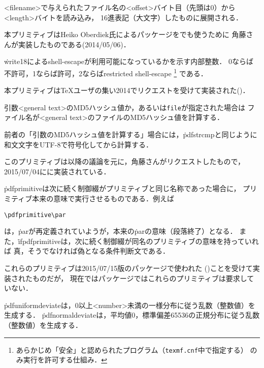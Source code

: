\documentclass[a4paper,11pt,nomag]{jsarticle}
\begin{document}
\begin{cslist}
  <filename>で与えられたファイル名の<offset>バイト目（先頭は0）から<length>バイトを読み込み，
  16進表記（大文字）したものに展開される．

  本プリミティブはHeiko Oberdiek氏によるパッケージを\epTeX でも使うために
  角藤さんが実装したものである(2014/05/06)．

  \.{write18}によるshell-escapeが利用可能になっているかを示す内部整数．
  0ならば不許可，1ならば許可，2ならばrestricted shell-escape%
  \footnote{あらかじめ「安全」と認められたプログラム（\texttt{texmf.cnf}中で指定する）
    のみ実行を許可する仕組み．}%
  である．

  本プリミティブは\TeX ユーザの集い2014でリクエストを受けて実装された(\cite{pdfse})．

  引数<general text>のMD5ハッシュ値か，あるいは\texttt{file}が指定された場合は
  ファイル名が<general text>のファイルのMD5ハッシュ値を計算する．

  前者の「引数のMD5ハッシュ値を計算する」場合には，\.{pdfstrcmp}と同じように
  和文文字をUTF-8で符号化してから計算する．

  このプリミティブは\cite{xe5}以降の議論を元に，角藤さんがリクエストしたもので，
  2015/07/04に\epTeX に実装されている．

  \.{pdfprimitive}は次に続く制御綴がプリミティブと同じ名称であった場合に，
  プリミティブ本来の意味で実行させるものである．例えば
\begin{verbatim}
\pdfprimitive\par
\end{verbatim}
  は，\.{par}が再定義されていようが，本来の\.{par}の意味（段落終了）となる．
  また，\.{ifpdfprimitive}は，次に続く制御綴が同名のプリミティブの意味を持っていれば
  真，そうでなければ偽となる条件判断文である．

  これらのプリミティブは2015/07/15版のパッケージで使われた
  (\cite{15715})ことを受けて実装されたものだが，
  現在ではパッケージではこれらのプリミティブは要求していない．

  \.{pdfuniformdeviate}は，0以上<number>未満の一様分布に従う乱数（整数値）を生成する．
  \.{pdfnormaldeviate}は，平均値0，標準偏差65536の正規分布に従う乱数（整数値）を生成する．


\end{cslist}
\end{document}
